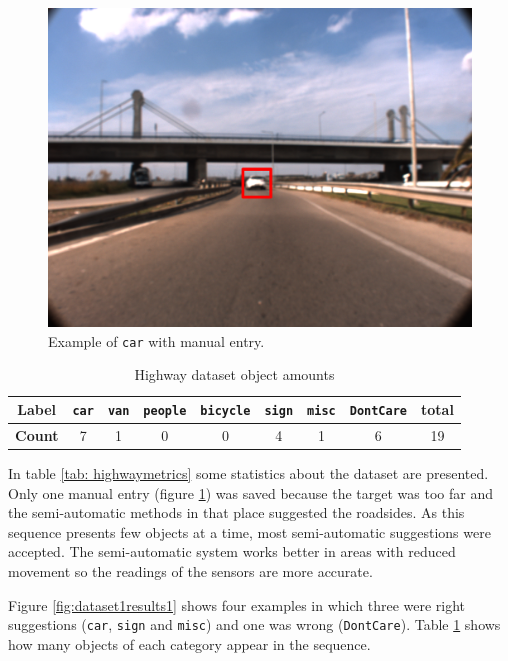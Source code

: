 \begin{figure}[htp]
	
	\centering
	
	\includegraphics[width=.8\textwidth]{capresults/imgs/manual1.png}
	
	\caption{Example of \texttt{car} with manual entry.}
	\label{fig:dataset1results2}
	
\end{figure}

\begin{table}[htp]
	\centering
	\caption{Highway dataset object amounts}
	\label{tab: highwaystats}
	\begin{tabular}{c|c|c|c|c|c|c|c|c}
		\textbf{Label} & \texttt{car} & \texttt{van} & \texttt{people} & \texttt{bicycle} & \texttt{sign} & \texttt{misc} & \texttt{DontCare} & \textbf{total} \\ \hline
		\textbf{Count} & 7            & 1            & 0               & 0                & 4             & 1             & 6                 & 19            
		 
	\end{tabular}
\end{table}

In table \ref{tab: highwaymetrics} some statistics about the dataset are presented. Only one manual entry (figure \ref{fig:dataset1results2}) was saved because the target was too far and the semi-automatic methods in that place suggested the roadsides. As this sequence presents few objects at a time, most semi-automatic suggestions were accepted. The semi-automatic system works better in areas with reduced movement so the readings of the sensors are more accurate.

Figure \ref{fig:dataset1results1} shows four examples in which three were right suggestions (\texttt{car}, \texttt{sign} and \texttt{misc}) and one was wrong (\texttt{DontCare}). Table \ref{tab: highwaystats} shows how many objects of each category appear in the sequence.

